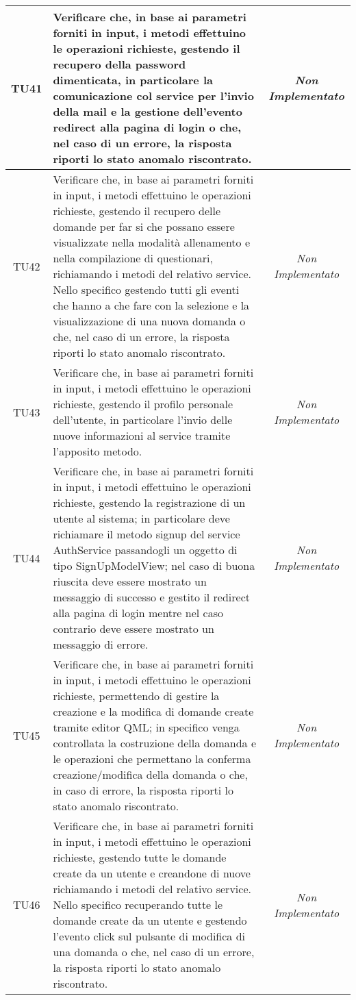 \begin{longtable}{|c|>{}m{10cm}|c|}
\hypertarget{TU41}{TU41} & Verificare che, in base ai parametri forniti in input, i metodi effettuino le operazioni richieste, gestendo il recupero della password dimenticata, in particolare la comunicazione col service per l'invio della mail e la gestione dell'evento redirect alla pagina di login o che, nel caso di un errore, la risposta riporti lo stato anomalo riscontrato. & \textit{Non Implementato}\\ \hline
\hypertarget{TU42}{TU42} & Verificare che, in base ai parametri forniti in input, i metodi effettuino le operazioni richieste, gestendo il recupero delle domande per far si che possano essere visualizzate nella modalità allenamento e nella compilazione di questionari, richiamando i metodi del relativo service. Nello specifico gestendo tutti gli eventi che hanno a che fare con la selezione e la visualizzazione di una nuova domanda o che, nel caso di un errore, la risposta riporti lo stato anomalo riscontrato. & \textit{Non Implementato}\\ \hline
\hypertarget{TU43}{TU43} & Verificare che, in base ai parametri forniti in input, i metodi effettuino le operazioni richieste, gestendo il profilo personale dell'utente, in particolare l'invio delle nuove informazioni al service tramite l'apposito metodo. & \textit{Non Implementato}\\ \hline
\hypertarget{TU44}{TU44} & Verificare che, in base ai parametri forniti in input, i metodi effettuino le operazioni richieste, gestendo la registrazione di un utente al sistema; in particolare deve richiamare il metodo signup del service AuthService passandogli un oggetto
di tipo SignUpModelView; nel caso di buona riuscita deve essere mostrato un messaggio di successo e gestito il redirect alla pagina di login mentre nel caso contrario deve essere mostrato un messaggio di errore. & \textit{Non Implementato}\\ \hline
\hypertarget{TU45}{TU45} & Verificare che, in base ai parametri forniti in input, i metodi effettuino le operazioni richieste, permettendo di gestire la creazione e la modifica di domande create tramite editor QML; in specifico venga controllata la costruzione della domanda e le operazioni che permettano la conferma creazione/modifica della domanda o che, in caso di errore, la risposta riporti lo stato anomalo riscontrato. & \textit{Non Implementato}\\ \hline
\hypertarget{TU46}{TU46} & Verificare che, in base ai parametri forniti in input, i metodi effettuino le operazioni richieste, gestendo tutte le domande create da un utente e creandone di nuove richiamando i metodi del relativo service. Nello specifico recuperando tutte le domande create da un utente e gestendo l'evento click sul pulsante di modifica di una domanda o che, nel caso di un errore, la risposta riporti lo stato anomalo riscontrato. & \textit{Non Implementato}\\ \hline

\end{longtable}

